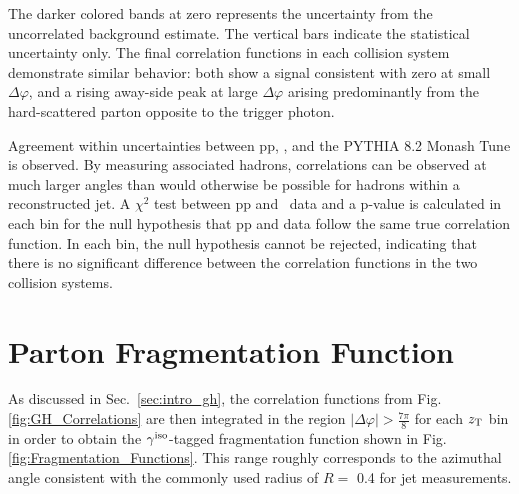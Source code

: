 
The darker colored bands at zero represents the uncertainty from the uncorrelated background estimate. The vertical bars indicate the statistical uncertainty only. The final correlation functions in each collision system demonstrate similar behavior: both show a signal consistent with zero at small $\Delta\varphi$, and a rising away-side peak at large $\Delta\varphi$ arising predominantly from the hard-scattered parton opposite to the trigger photon.

Agreement within uncertainties between pp, \pPb, and the \textsc{PYTHIA 8.2} Monash Tune is observed.
By measuring associated hadrons, correlations can be observed at much larger angles than would otherwise be possible for hadrons within a reconstructed jet. A $\chi^2$ test between pp and \pPb~data and a p-value is calculated in each \zt bin for the null hypothesis that pp and \pPb data follow the same true correlation function. In each bin, the null hypothesis cannot be rejected, indicating that there is no significant difference between the correlation functions in the two collision systems.

\section{Parton Fragmentation Function}
As discussed in Sec.~\ref{sec:intro_gh}, the correlation functions from Fig. \ref{fig:GH_Correlations} are then integrated in the region $|\Delta\varphi| > \frac{7\pi}{8}$ for each $z_{\mathrm{T}}$ bin in order to obtain the $\gamma^\mathrm{iso}$-tagged fragmentation function shown in Fig. \ref{fig:Fragmentation_Functions}. This range roughly corresponds to the azimuthal angle consistent with the commonly used radius of $R=$ 0.4 for jet measurements.


